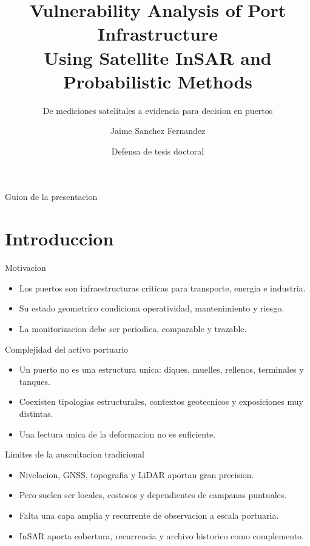 \documentclass[aspectratio=169]{beamer}
\title{Vulnerability Analysis of Port Infrastructure\\Using Satellite InSAR and Probabilistic Methods}
\subtitle{De mediciones satelitales a evidencia para decision en puertos}
\author{Jaime Sanchez Fernandez}
\date{Defensa de tesis doctoral}
\institute{Universidad Politecnica de Madrid}
\begin{document}
\maketitle

\begin{frame}{Guion de la presentacion}
  \tableofcontents
\end{frame}

\section{Introduccion}

\begin{frame}{Motivacion}
  \begin{itemize}
    \item Los puertos son infraestructuras criticas para transporte, energia e industria.
    \item Su estado geometrico condiciona operatividad, mantenimiento y riesgo.
    \item La monitorizacion debe ser periodica, comparable y trazable.
  \end{itemize}
\end{frame}

\begin{frame}{Complejidad del activo portuario}
  \begin{itemize}
    \item Un puerto no es una estructura unica: diques, muelles, rellenos, terminales y tanques.
    \item Coexisten tipologias estructurales, contextos geotecnicos y exposiciones muy distintas.
    \item Una lectura unica de la deformacion no es suficiente.
  \end{itemize}
\end{frame}

\begin{frame}{Limites de la auscultacion tradicional}
  \begin{itemize}
    \item Nivelacion, GNSS, topografia y LiDAR aportan gran precision.
    \item Pero suelen ser locales, costosos y dependientes de campanas puntuales.
    \item Falta una capa amplia y recurrente de observacion a escala portuaria.
    \item InSAR aporta cobertura, recurrencia y archivo historico como complemento.
  \end{itemize}
\end{frame}
\end{document}
